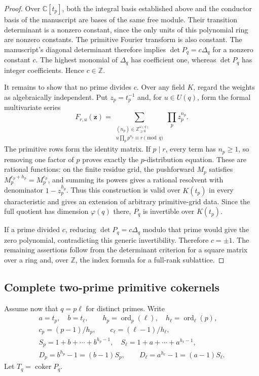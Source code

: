 \documentclass[11pt,a4paper]{article}
\numberwithin{equation}{section}
\theoremstyle{plain}
\theoremstyle{definition}
\theoremstyle{remark}
\begin{document}
\begin{proof}
Over $\mathbb C[t_p]$, both the integral basis established above and
the conductor basis of the manuscript are bases of the same free
module. Their transition determinant is a nonzero constant, since the
only units of this polynomial ring are nonzero constants. The
primitive Fourier transform is also constant. The manuscript's
diagonal determinant therefore implies
$\det P_q=c\Delta_q$ for a nonzero constant $c$.
The highest monomial of $\Delta_q$ has coefficient one, whereas
$\det P_q$ has integer coefficients. Hence $c\in\mathbb Z$.

It remains to show that no prime divides $c$. Over any field $K$,
regard the weights as algebraically independent. Put $z_p=t_p^{-1}$
and, for $u\in U(q)$, form the formal multivariate series
\[
 F_{r,u}(\mathbf z)=
 \sum_{\substack{(n_p)\in\mathbb Z_{\ge0}^{\omega(q)}\\
    u\prod_pp^{n_p}\equiv r\pmod q}}
 \prod_pz_p^{n_p}.
\]
The primitive rows form the identity matrix. If $p\mid r$, every term
has $n_p\ge1$, so removing one factor of $p$ proves exactly the
$p$-distribution equation. These are rational functions: on the finite
residue grid, the pushforward $M_p$ satisfies
$M_p^{e_p+h_p}=M_p^{e_p}$, and summing its powers gives a rational
resolvent with denominator $1-z_p^{h_p}$. Thus this construction is
valid over $K(t_p)$ in every characteristic and gives an extension of
arbitrary primitive-grid data. Since the full quotient has dimension
$\varphi(q)$ there, $P_q$ is invertible over $K(t_p)$.

If a prime divided $c$, reducing $\det P_q=c\Delta_q$ modulo that
prime would give the zero polynomial, contradicting this generic
invertibility. Therefore $c=\pm1$. The remaining assertions follow
from the determinant criterion for a square matrix over a ring and,
over $\mathbb Z$, the index formula for a full-rank sublattice.
\end{proof}

\subsection{Complete two-prime primitive cokernels}

Assume now that $q=p\ell$ for distinct primes. Write
\begin{equation}\label{intdist:eq:two-prime-notation}
 \begin{gathered}
 a=t_p,\quad b=t_\ell,\qquad
 h_p=\operatorname{ord}_{p}(\ell),\quad
 h_\ell=\operatorname{ord}_{\ell}(p),\\
 c_p=(p-1)/h_p,\qquad c_\ell=(\ell-1)/h_\ell,\\
 S_p=1+b+\cdots+b^{h_p-1},\quad
 S_\ell=1+a+\cdots+a^{h_\ell-1},\\
 D_p=b^{h_p}-1=(b-1)S_p,\qquad
 D_\ell=a^{h_\ell}-1=(a-1)S_\ell.
 \end{gathered}
\end{equation}
Let $T_q=\operatorname{coker}P_q$.
\end{document}
